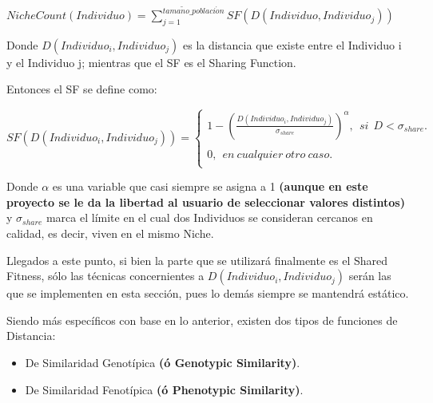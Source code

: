 \documentclass[letterpaper,10pt,english]{sphinxmanual}
\begin{document}
\begin{center}\(NicheCount(Individuo) = \sum_{j=1}^{tama\tilde{n}o\_poblaci\acute{o}n}SF(D(Individuo,Individuo_j))\)
\end{center}
\begin{DUlineblock}{0em}
\item[] Donde \(D(Individuo_i,Individuo_j)\) es la distancia que existe entre el Individuo i y el Individuo j;
mientras que el SF es el Sharing Function.
\item[] Entonces el SF se define como:
\end{DUlineblock}

\begin{center}\(SF(D(Individuo_i,Individuo_j)) = \left\{ \begin{array}{lcc}
              1 - (\frac{D(Individuo_i,Individuo_j)}{\sigma_{share}})^{\alpha},\ \ si\ \ D < \sigma_{share}. \\
              \\ 0,\ \ en\ cualquier\ otro\ caso. \\
         \end{array}
\right.\)
\end{center}
\begin{DUlineblock}{0em}
\item[] Donde \(\alpha\) es una variable que casi siempre se asigna a 1 \textbf{(aunque en este proyecto se le
da la libertad al usuario de seleccionar valores distintos)} y \(\sigma_{share}\) marca el límite en el
cual dos Individuos se consideran cercanos en calidad, es decir, viven en el mismo Niche.
\item[] 
\item[] Llegados a este punto, si bien la parte que se utilizará finalmente es el Shared Fitness,
sólo las técnicas concernientes a \(D(Individuo_i,Individuo_j)\)
serán las que se implementen en esta sección, pues lo demás siempre se mantendrá estático.
\item[] 
\item[] Siendo más específicos con base en lo anterior, existen dos tipos de funciones de Distancia:
\end{DUlineblock}
\begin{itemize}
\item {} 
De Similaridad Genotípica \textbf{(ó Genotypic Similarity)}.

\item {} 
De Similaridad Fenotípica \textbf{(ó Phenotypic Similarity)}.

\end{itemize}
\end{document}

